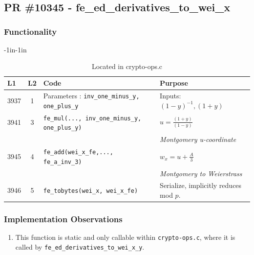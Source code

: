 \documentclass[12pt,titlepage,table]{article}
\begin{document}
\newpage
\subsection{PR \#10345 - fe\_ed\_derivatives\_to\_wei\_x}
\subsubsection{Functionality}


\begin{table}[htbp]
\caption{fe\_ed\_derivatives\_to\_wei\_x Source To Spec Map}
\begin{adjustwidth}{-1in}{-1in}
\centering
{
\begin{tabular}{| l | c | l | l |}
\hline
\textbf{L1} & \textbf{L2} & \textbf{Code} & \textbf{Purpose} \\
\hline
\hline
3937 & 1 & Parameters : \verb+inv_one_minus_y, one_plus_y+ & Inputs: $(1-y)^{-1}, (1+y)$ \\
3941 & 3 & \verb+fe_mul(..., inv_one_minus_y, one_plus_y)+ & $u = \frac{(1+y)}{(1-y)}$\\
&&& \textit{Montgomery u-coordinate}\\ 
3945 & 4 & \verb+fe_add(wei_x_fe,..., fe_a_inv_3)+ & $w_x = u + \frac{A}{3}$\\ &&&\textit{Montgomery to Weierstrass}\\
3946 & 5 & \verb+fe_tobytes(wei_x, wei_x_fe)+ & Serialize, implicitly reduces mod $p$. \\
\hline
\end{tabular}}
\end{adjustwidth}
\caption*{Located in crypto-ops.c}
\end{table}

\subsubsection{Implementation Observations}
\begin{enumerate}
    \item This function is static and only callable within \verb+crypto-ops.c+, where it is called by \verb+fe_ed_derivatives_to_wei_x_y+.
\end{enumerate}
\end{document}
